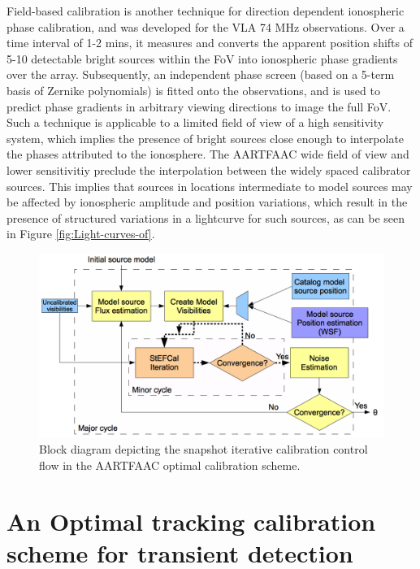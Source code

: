 \documentclass{aa}
\begin{document}
Field-based   calibration\citep{cottona2004beyond}  is  another   technique  for
direction dependent ionospheric phase calibration, and was developed for the VLA
74 MHz observations. Over a time  interval of 1-2 mins, it measures and converts
the apparent  position shifts of 5-10  detectable bright sources  within the FoV
into ionospheric  phase gradients over  the array. Subsequently,  an independent
phase screen (based on a 5-term basis of Zernike polynomials) is fitted onto the
observations,  and is  used  to  predict phase  gradients  in arbitrary  viewing
directions to  image the full FoV. Such  a technique is applicable  to a limited
field of view of a high sensitivity system, which implies the presence of bright
sources close enough to interpolate the phases attributed to the ionosphere. The
AARTFAAC wide  field of view  and lower sensitivitiy preclude  the interpolation
between  the widely  spaced calibrator  sources.  This implies  that sources  in
locations intermediate to model sources may be affected by ionospheric amplitude
and position variations,  which result in the presence  of structured variations
in   a   lightcurve   for   such   sources,   as   can   be   seen   in   Figure
\ref{fig:Light-curves-of}.

\begin{figure}[tbh]
\includegraphics[width=1\columnwidth]{Figs/Fig2_blkdiag}
\caption{Block diagram depicting the snapshot
iterative calibration control flow in the AARTFAAC optimal calibration
scheme. }
\label{fig:Block-diagram-depicting}
\end{figure}

\section{\label{sec:An-Optimal,-tracking}An Optimal tracking calibration
scheme for transient detection}
\end{document}
